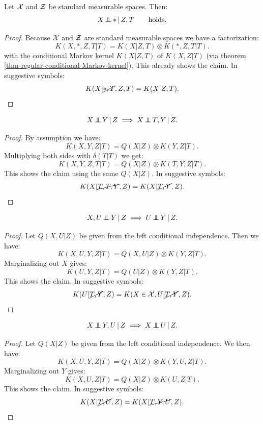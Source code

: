 \begin{Lem} Let $\mathcal{X}$ and $\mathcal{Z}$ be standard measurable spaces. Then:
    \[X \operatorname*{\perp\mkern-11mu\perp}  \ast \operatorname*{|} Z,T \qquad \text{holds.}\]
\begin{proof}
    Because $\mathcal{X}$ and $\mathcal{Z}$ are standard measurable spaces
    we have a factorization:
    \[ K(X,\ast, Z,T|T) = K(X|Z,T) \otimes K(\ast, Z,T|T).\]
    with the conditional Markov kernel $K(X|Z,T)$ of $K(X,Z|T)$ (via theorem \ref{thm-regular-conditional-Markov-kernel}).
    This already shows the claim. 
    In suggestive symbols:
    \[K(X|\cancel{\ast,T},Z,T) = K(X|Z,T).\]
\end{proof}
\end{Lem}

\begin{Lem}
    \[X \operatorname*{\perp\mkern-11mu\perp}  Y \operatorname*{|} Z \implies X \operatorname*{\perp\mkern-11mu\perp}  T, Y \operatorname*{|} Z.\]
\begin{proof}
    By assumption we have:
    \[ K(X,Y,Z|T) = Q(X|Z) \otimes K(Y,Z|T). \]
    Multiplying both sides with $\delta(T|T)$ we get:
    \[ K(X,Y,Z,T|T) = Q(X|Z) \otimes K(T,Y,Z|T). \]
    This shows the claim using the same $Q(X|Z)$. 
    In suggestive symbols:
\[ K(X|\cancel{T,T,Y},Z) = K(X|\cancel{T,Y},Z).  \]
\end{proof}
\end{Lem}



\begin{Lem}
    \[X,U \operatorname*{\perp\mkern-11mu\perp}  Y \operatorname*{|} Z \implies U \operatorname*{\perp\mkern-11mu\perp}  Y \operatorname*{|} Z.\]
\begin{proof}
    Let $Q(X,U|Z)$ be given from the left conditional independence.
    Then we have:
    \[ K(X,U,Y,Z|T) = Q(X,U|Z) \otimes K(Y,Z|T).\]
    Marginalizing out $X$ gives:
    \[ K(U,Y,Z|T) = Q(U|Z) \otimes K(Y,Z|T).\]
    This shows the claim.
 In suggestive symbols:
 \[ K(U|\cancel{T,Y},Z) = K(X \in \mathcal{X},U|\cancel{T,Y},Z). \]
\end{proof}
\end{Lem}


\begin{Lem}
    \[X \operatorname*{\perp\mkern-11mu\perp}  Y,U \operatorname*{|} Z \implies X \operatorname*{\perp\mkern-11mu\perp}  U \operatorname*{|} Z.\]
\begin{proof}
    Let $Q(X|Z)$ be given from the left conditional independence. 
    We then have:
    \[ K(X,U,Y,Z|T) = Q(X|Z) \otimes K(Y,U,Z|T).\]
    Marginalizing out $Y$ gives:
    \[ K(X,U,Z|T) = Q(X|Z) \otimes K(U,Z|T).\]
    This shows the claim.
In suggestive symbols:
\[ K(X|\cancel{T,U},Z) = K(X|\cancel{T,Y,U},Z). \]
\end{proof}
\end{Lem}

